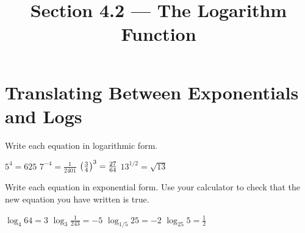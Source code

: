

\title{Section 4.2 --- The Logarithm Function}


\maketitle

\section*{Translating Between Exponentials and Logs}
Write each equation in logarithmic form.
\begin{smenum}
\mitemxxxx
{$5^4=625$}
{$7^{-4}=\frac{1}{2401}$}
{$\left(\frac{3}{4}\right)^3=\frac{27}{64}$}
{$13^{1/2}=\sqrt{13}$}
\end{smenum}
Write each equation in exponential form.  Use your calculator to check that the new equation you have written is true.
\begin{smenum}
\mitemxxxx
{$\log_4{64}=3$}
{$\log_3{\frac{1}{243}}=-5$}
{$\log_{1/5}{25}=-2$}
{$\log_{25}{5}=\frac{1}{2}$}
\end{smenum}

